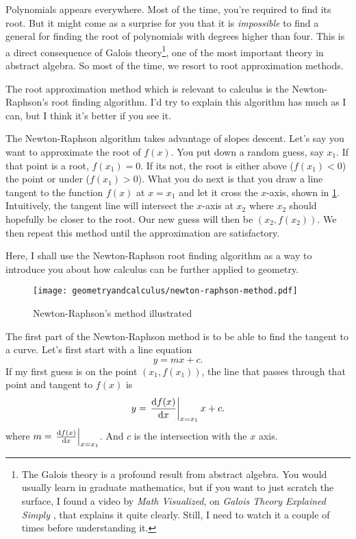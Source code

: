 Polynomials appears everywhere. Most of the time, you're required to find its root. But it might come as a surprise for you that it is \emph{impossible} to find a general for finding the root of polynomials with degrees higher than four. This is a direct consequence of Galois theory\footnote{The Galois theory is a profound result from abstract algebra. You would usually learn in graduate mathematics, but if you want to just scratch the surface, I found a video by \emph{Math Visualized}, on \emph{Galois Theory Explained Simply} \cite{galois-explained-2020}, that explains it quite clearly. Still, I need to watch it a couple of times before understanding it.}, one of the most important theory in abstract algebra. So most of the time, we resort to root approximation methods.

The root approximation method which is relevant to calculus is the Newton-Raphson's root finding algorithm. I'd try to explain this algorithm has much as I can, but I think it's better if you see it.

The Newton-Raphson algorithm takes advantage of slopes descent. Let's say you want to approximate the root of $f(x)$. You put down a random guess, say $x_1$. If that point is a root, $f(x_1) = 0$. If its not, the root is either above ($f(x_1) < 0$) the point or under ($f(x_1) > 0$). What you do next is that you draw a line tangent to the function $f(x)$ at $x = x_1$ and let it cross the $x$-axis, shown in \cref{fig:newton-raphson-method}. Intuitively, the tangent line will intersect the $x$-axis at $x_2$ where $x_2$ should hopefully be closer to the root. Our new guess will then be $(x_2, f(x_2))$. We then repeat this method until the approximation are satisfactory.

Here, I shall use the Newton-Raphson root finding algorithm as a way to introduce you about how calculus can be further applied to geometry.

\begin{figure}[ht]
	\centering
	\texttt{[image: geometryandcalculus/newton-raphson-method.pdf]}
	\caption{Newton-Raphson's method illustrated}
	\label{fig:newton-raphson-method}
\end{figure}

The first part of the Newton-Raphson method is to be able to find the tangent to a curve. Let's first start with a line equation
\begin{equation}
	y = mx + c.
\end{equation}
If my first guess is on the point $(x_1, f(x_1))$, the line that passes through that point and tangent to $f(x)$ is
\begin{equation}
	y = \odv{f(x)}{x}_{x = x_1}x + c.
\end{equation}
where $m = \odv{f(x)}{x}_{x = x_1}$. And $c$ is the intersection with the $x$ axis.

